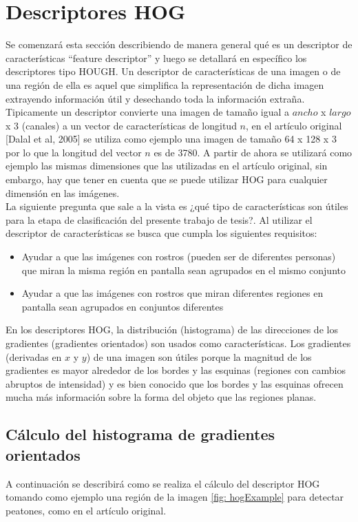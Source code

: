   \section{Descriptores HOG} \label{HOGMarco}
   Se comenzará esta sección describiendo de manera general qué es un descriptor de características ``feature descriptor'' y luego se detallará en específico los descriptores tipo HOUGH. Un descriptor de características de una imagen o de una región de ella es aquel que simplifica la representación de dicha imagen extrayendo información útil y desechando toda la información extraña.
   Tipicamente un descriptor convierte una imagen de tamaño igual a $ancho$ x $largo$ x $3$ (canales) a un vector de características de longitud $n$, en el artículo original [Dalal et al, 2005] se utiliza como ejemplo una imagen de tamaño 64 x 128 x 3 por lo que la longitud del vector $n$ es de 3780. A partir de ahora se utilizará como ejemplo las mismas dimensiones que las utilizadas en el artículo original, sin embargo, hay que tener en cuenta que se puede utilizar HOG para cualquier dimensión en las imágenes.\\
   La siguiente pregunta que sale a la vista es ¿qué tipo de características son útiles para la etapa de clasificación del presente trabajo de tesis?. Al utilizar el descriptor de características se busca que cumpla los siguientes requisitos:
   \begin{itemize}
		\item Ayudar a que las imágenes con rostros (pueden ser de diferentes personas) que miran la misma región en pantalla sean agrupados en el mismo conjunto
		\item Ayudar a que las imágenes con rostros que miran diferentes regiones en pantalla sean agrupados en conjuntos diferentes
   \end{itemize}
En los descriptores HOG, la distribución (histograma) de las direcciones de los gradientes (gradientes orientados) son usados como características. Los gradientes (derivadas en $x$ y $y$) de una imagen son útiles porque la magnitud de los gradientes es mayor alrededor de los bordes y las esquinas (regiones con cambios abruptos de intensidad) y es bien conocido que los bordes y las esquinas ofrecen mucha más información sobre la forma del objeto que las regiones planas.

\subsection{Cálculo del histograma de gradientes orientados}
A continuación se describirá como se realiza el cálculo del descriptor HOG tomando como ejemplo una región de la imagen \ref{fig: hogExample} para detectar peatones, como en el artículo original.

